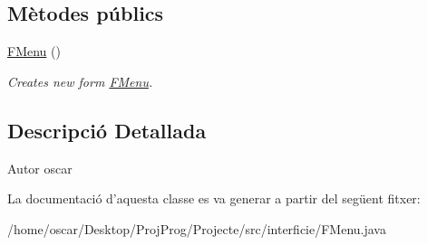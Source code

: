 \subsection*{Mètodes públics}
\begin{DoxyCompactItemize}
\item 
\hypertarget{classinterficie_1_1_f_menu_a4ff4376b7bf65b5b36d63d50cc1e66d5}{\hyperlink{classinterficie_1_1_f_menu_a4ff4376b7bf65b5b36d63d50cc1e66d5}{F\+Menu} ()}\label{classinterficie_1_1_f_menu_a4ff4376b7bf65b5b36d63d50cc1e66d5}

\begin{DoxyCompactList}\small\item\em Creates new form \hyperlink{classinterficie_1_1_f_menu}{F\+Menu}. \end{DoxyCompactList}\end{DoxyCompactItemize}


\subsection{Descripció Detallada}
\begin{DoxyAuthor}{Autor}
oscar 
\end{DoxyAuthor}


La documentació d'aquesta classe es va generar a partir del següent fitxer\+:\begin{DoxyCompactItemize}
\item 
/home/oscar/\+Desktop/\+Proj\+Prog/\+Projecte/src/interficie/F\+Menu.\+java\end{DoxyCompactItemize}
